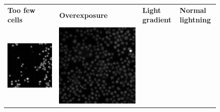 \begin{figure}[H]
    \centering
    \centering
        \begin{tabularx}{\textwidth}{YYYY}
            \textbf{Too few cells} &
            \textbf{Overexposure} &
            \textbf{Light gradient} &
            \textbf{Normal lightning} \\
            \includegraphics{bilder/lightning-conditions/lightning-1.png} & \includegraphics{bilder/lightning-conditions/lightning-2.png} &

\end{tabularx}
\end{figure}
